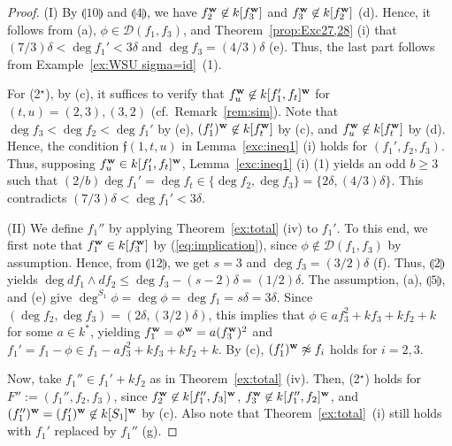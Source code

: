 \documentclass{amsart}
\theoremstyle{plain}
\theoremstyle{definition}
\newcommand{\w}{{\bf w}}
\begin{document}
\begin{proof}
(I) 
By $\llparenthesis 10 \rrparenthesis$ and 
$\llparenthesis 4 \rrparenthesis$, we have 
$f_2^{\w }\not\in k[f_3^{\w }]$ and $f_3^{\w }\not\in k[f_2^{\w }]$ (d). 
Hence, 
it follows from (a), $\phi \in \mathcal{D}(f_1,f_3)$, 
and Theorem~\ref{prop:Exc27,28} (i) that 
$(7/3)\delta <\deg f_1'<3\delta $ and $\deg f_3=(4/3)\delta $ (e). 
Thus, the last part follows from 
Example~\ref{ex:WSU sigma=id}~(1). 



For (2$^\star $), by (c), 
it suffices to verify that $f_u^{\w }\not\in k[f_1',f_t]^{\w }$ 
for $(t,u)=(2,3),(3,2)$ 
(cf.\ Remark~\ref{rem:sim}). 
Note that $\deg f_3<\deg f_2<\deg f_1'$ by (e), 
$(f_1')^{\w }\not\in k[f_t^{\w }]$ by (c), 
and $f_u^{\w }\not\in k[f_t^{\w }]$ by (d). 
Hence, 
the condition $\mathfrak{f}(1,t,u)$ in Lemma~\ref{exc:ineq1} (i) 
holds for $(f_1',f_2,f_3)$. 
Thus, supposing $f_u^{\w }\in k[f_1',f_t]^{\w }$, 
Lemma~\ref{exc:ineq1} (i) (1) yields an odd $b\ge 3$ 
such that 
$(2/b)\deg f_1'=\deg f_t
\in \{ \deg f_2,\deg f_3\} =\{ 2\delta ,(4/3)\delta \} $. 
This contradicts $(7/3)\delta <\deg f_1'<3\delta $. 



(II) 
We define $f_1''$ 
by applying Theorem~\ref{ex:total} (iv) to $f_1'$. 
To this end, 
we first note that 
$f_1^{\w }\in k[f_3^{\w }]$ by (\ref{eq:implication}), 
since $\phi \not\in \mathcal{D}(f_1,f_3)$ by assumption. 
Hence, 
from $\llparenthesis 12 \rrparenthesis$, 
we get 
$s=3$ and $\deg f_3=(3/2)\delta $ (f). 
Thus, 
$\llparenthesis 2 \rrparenthesis$ yields 
$\deg df_1\wedge df_2\le \deg f_3-(s-2)\delta =(1/2)\delta $. 
The assumption, 
(a), $\llparenthesis 5 \rrparenthesis$, and (e) give 
$\deg ^{S_1}\phi =\deg \phi =\deg f_1=s\delta =3\delta $. 
Since $(\deg f_2,\deg f_3)=(2\delta ,(3/2)\delta )$, 
this implies that 
$\phi \in af_3^2+kf_3+kf_2+k$ for some $a\in k^*$, 
yielding $f_1^{\w }=\phi ^{\w }=a(f_3^{\w })^2$ 
and $f_1'=f_1-\phi \in f_1-af_3^2+kf_3+kf_2+k$. 
By (c), 
$(f_1')^{\w }\not\approx f_i$ holds for $i=2,3$. 


Now, take $f_1''\in f_1'+kf_2$ as in Theorem~\ref{ex:total} (iv). 
Then, 
(2$^\star $) holds for $F'':=(f_1'',f_2,f_3)$, 
since 
$f_2^{\w }\not\in k[f_1'',f_3]^{\w }$, 
$f_3^{\w }\not\in k[f_1'',f_2]^{\w }$, 
and $(f_1'')^{\w }=(f_1')^{\w }\not\in k[S_1]^{\w }$ by (c). 
Also note that Theorem~\ref{ex:total}~(i) 
still holds with $f_1'$ replaced by $f_1''$ (g). 



\end{proof}
\end{document}
